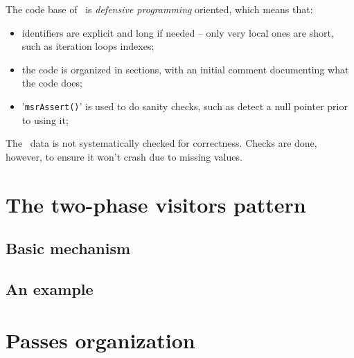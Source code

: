 \documentclass[12pt,a4paper]{article}
\begin{document}
The code base of \xmlToLy\ is {\it defensive programming} oriented, which means that:
\begin{itemize}
\item identifiers are explicit and long if needed -- only very local ones are short, such as iteration loops indexes;

\item the code is organized in sections, with an initial comment documenting what the code does;

\item '{\tt msrAssert()}' is used to do sanity checks, such as detect a null pointer prior to using it;
\end{itemize}

The \mxml\ data is not systematically checked for correctness. Checks are done, however, to ensure it won't crash due to missing values.


\section{The two-phase visitors pattern}

\subsection{Basic mechanism}

\subsection{An example}


\section{Passes organization}
\end{document}
